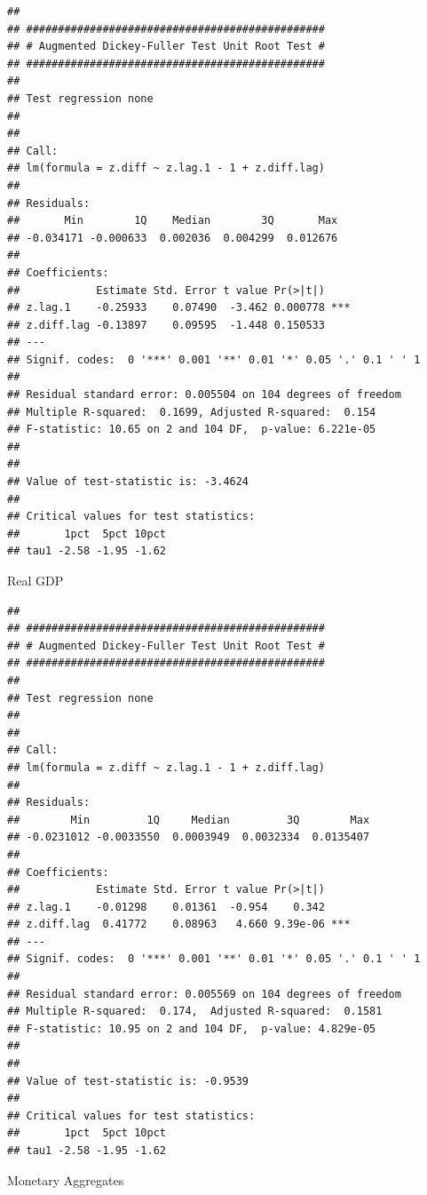 \documentclass[11pt,preprint, authoryear]{elsarticle}
\numberwithin{equation}{section}
\numberwithin{figure}{section}
\numberwithin{table}{section}
\begin{document}
\begin{verbatim}
## 
## ############################################### 
## # Augmented Dickey-Fuller Test Unit Root Test # 
## ############################################### 
## 
## Test regression none 
## 
## 
## Call:
## lm(formula = z.diff ~ z.lag.1 - 1 + z.diff.lag)
## 
## Residuals:
##       Min        1Q    Median        3Q       Max 
## -0.034171 -0.000633  0.002036  0.004299  0.012676 
## 
## Coefficients:
##            Estimate Std. Error t value Pr(>|t|)    
## z.lag.1    -0.25933    0.07490  -3.462 0.000778 ***
## z.diff.lag -0.13897    0.09595  -1.448 0.150533    
## ---
## Signif. codes:  0 '***' 0.001 '**' 0.01 '*' 0.05 '.' 0.1 ' ' 1
## 
## Residual standard error: 0.005504 on 104 degrees of freedom
## Multiple R-squared:  0.1699, Adjusted R-squared:  0.154 
## F-statistic: 10.65 on 2 and 104 DF,  p-value: 6.221e-05
## 
## 
## Value of test-statistic is: -3.4624 
## 
## Critical values for test statistics: 
##       1pct  5pct 10pct
## tau1 -2.58 -1.95 -1.62
\end{verbatim}

Real GDP

\begin{verbatim}
## 
## ############################################### 
## # Augmented Dickey-Fuller Test Unit Root Test # 
## ############################################### 
## 
## Test regression none 
## 
## 
## Call:
## lm(formula = z.diff ~ z.lag.1 - 1 + z.diff.lag)
## 
## Residuals:
##        Min         1Q     Median         3Q        Max 
## -0.0231012 -0.0033550  0.0003949  0.0032334  0.0135407 
## 
## Coefficients:
##            Estimate Std. Error t value Pr(>|t|)    
## z.lag.1    -0.01298    0.01361  -0.954    0.342    
## z.diff.lag  0.41772    0.08963   4.660 9.39e-06 ***
## ---
## Signif. codes:  0 '***' 0.001 '**' 0.01 '*' 0.05 '.' 0.1 ' ' 1
## 
## Residual standard error: 0.005569 on 104 degrees of freedom
## Multiple R-squared:  0.174,  Adjusted R-squared:  0.1581 
## F-statistic: 10.95 on 2 and 104 DF,  p-value: 4.829e-05
## 
## 
## Value of test-statistic is: -0.9539 
## 
## Critical values for test statistics: 
##       1pct  5pct 10pct
## tau1 -2.58 -1.95 -1.62
\end{verbatim}

Monetary Aggregates
\end{document}
